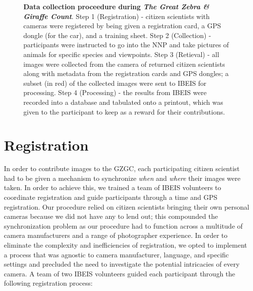 \begin{figure*}[t]%
	\centering
	\caption[Data Collection Proceedure During \textit{The Great Zebra \& Giraffe Count}]{\textbf{Data collection proceedure during \textit{The Great Zebra \& Giraffe Count}}.  Step 1 (Registration) - citizen scientists with cameras were registered by being given a registration card, a GPS dongle (for the car), and a training sheet.  Step 2 (Collection) - participants were instructed to go into the NNP and take pictures of animals for specific species and viewpoints.  Step 3 (Retieval) - all images were collected from the camera of returned citizen scientists along with metadata from the registration cards and GPS dongles; a subset (in red) of the collected images were sent to IBEIS for processing.  Step 4 (Processing) - the results from IBEIS were recorded into a database and tabulated onto a printout, which was given to the participant to keep as a reward for their contributions.}
    	\label{fig:process}
\end{figure*}

\section{Registration} 
In order to contribute images to the GZGC, each participating citizen scientist had to be given a mechanism to synchronize \textit{when} and \textit{where} their images were taken.  In order to achieve this, we trained a team of IBEIS volunteers to coordinate registration and guide participants through a time and GPS registration.  Our procedure relied on citizen scientists bringing their own personal cameras because we did not have any to lend out; this compounded the synchronization problem as our procedure had to function across a multitude of camera manufacturers and a range of photographer experience.  In order to eliminate the complexity and inefficiencies of registration, we opted to implement a process that was agnostic to camera manufacturer, language, and specific settings and precluded the need to investigate the potential intricacies of every camera.  A team of two IBEIS volunteers guided each participant through the following registration process:

